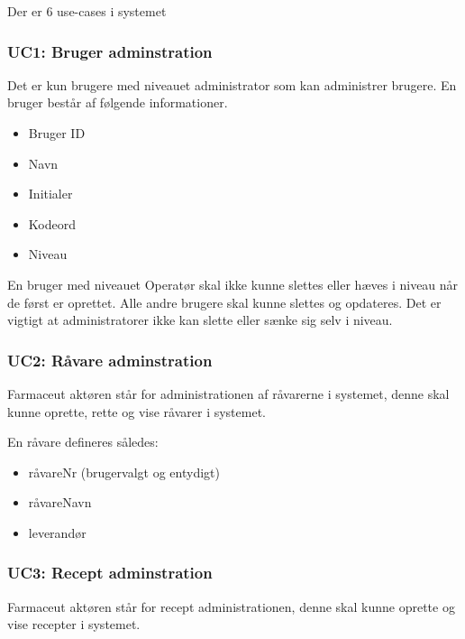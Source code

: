 \documentclass[a4paper]{article}
\begin{document}
Der er 6 use-cases i systemet

\subsubsection{UC1: Bruger adminstration} %

Det er kun brugere med niveauet administrator som kan administrer brugere. En bruger består af følgende informationer.

\begin{itemize}
  \item Bruger ID
  \item Navn
  \item Initialer
  \item Kodeord
  \item Niveau
\end{itemize}

En bruger med niveauet Operatør skal ikke kunne slettes eller hæves i niveau når de først er oprettet.  Alle andre brugere skal kunne slettes og opdateres. Det er vigtigt at administratorer ikke kan slette eller sænke sig selv i niveau.   


\subsubsection{UC2: Råvare adminstration} %

Farmaceut aktøren står for administrationen af råvarerne i systemet, denne skal kunne oprette, rette og vise råvarer i systemet.

En råvare defineres således:

\begin{itemize}
  \item råvareNr (brugervalgt og entydigt)
  \item råvareNavn
  \item leverandør
\end{itemize}


\subsubsection{UC3: Recept adminstration} %

Farmaceut aktøren står for recept administrationen, denne skal kunne oprette og vise recepter i systemet.
\end{document}
